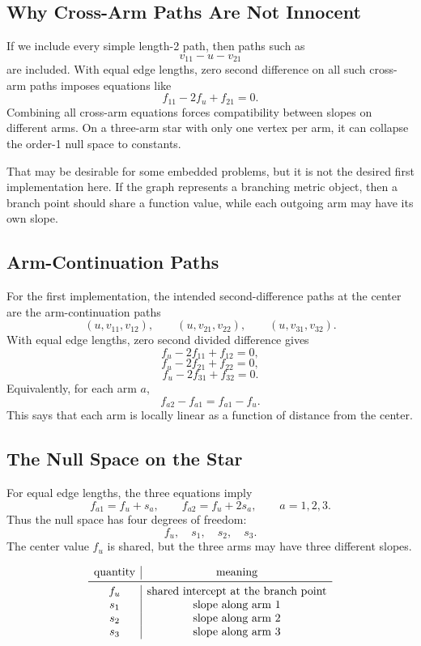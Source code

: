 \documentclass[11pt]{article}
\begin{document}
\subsection{Why Cross-Arm Paths Are Not Innocent}

If we include every simple length-2 path, then paths such as
\[
  v_{11}-u-v_{21}
\]
are included.  With equal edge lengths, zero second difference on all such
cross-arm paths imposes equations like
\[
  f_{11}-2f_u+f_{21}=0.
\]
Combining all cross-arm equations forces compatibility between slopes on
different arms.  On a three-arm star with only one vertex per arm, it can
collapse the order-1 null space to constants.

That may be desirable for some embedded problems, but it is not the desired
first implementation here.  If the graph represents a branching metric object,
then a branch point should share a function value, while each outgoing arm may
have its own slope.

\subsection{Arm-Continuation Paths}

For the first implementation, the intended second-difference paths at the
center are the arm-continuation paths
\[
  (u,v_{11},v_{12}),\qquad
  (u,v_{21},v_{22}),\qquad
  (u,v_{31},v_{32}).
\]
With equal edge lengths, zero second divided difference gives
\[
  f_u - 2f_{11} + f_{12}=0,
\]
\[
  f_u - 2f_{21} + f_{22}=0,
\]
\[
  f_u - 2f_{31} + f_{32}=0.
\]
Equivalently, for each arm \(a\),
\[
  f_{a2}-f_{a1}
  =
  f_{a1}-f_u.
\]
This says that each arm is locally linear as a function of distance from the
center.

\subsection{The Null Space on the Star}

For equal edge lengths, the three equations imply
\[
  f_{a1}=f_u+s_a,
  \qquad
  f_{a2}=f_u+2s_a,
  \qquad a=1,2,3.
\]
Thus the null space has four degrees of freedom:
\[
  f_u,\quad s_1,\quad s_2,\quad s_3.
\]
The center value \(f_u\) is shared, but the three arms may have three
different slopes.

\[
\begin{array}{c|c}
\text{quantity} & \text{meaning}\\
\midrule
f_u & \text{shared intercept at the branch point}\\
s_1 & \text{slope along arm 1}\\
s_2 & \text{slope along arm 2}\\
s_3 & \text{slope along arm 3}
\end{array}
\]
\end{document}
